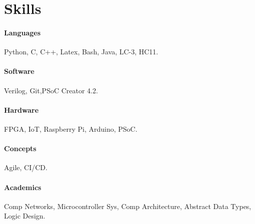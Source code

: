 \documentclass[12pt,letterpaper]{report}
\newcommand{\verticalgap}{2em}
\newcommand{\verticalskillgap}{.2em}
\newcommand{\skillspace}{0.35em}
\newcommand{\rightcolumn}{0.21\linewidth}
\begin{document}
% 
	\begin{minipage}[t]{\rightcolumn}
		\vspace{\verticalgap}
	\section*{Skills}
	\vspace{\verticalskillgap}
    \raggedright
    \paragraph*{Languages}
		Python, C, C++, Latex, Bash, Java, LC-3, HC11. 
	\vspace{\skillspace}
	\paragraph*{Software}
		Verilog, Git,\newline PSoC Creator 4.2.
	\vspace{\skillspace}
    \paragraph*{Hardware}
		 FPGA, IoT, Raspberry Pi, Arduino, PSoC.
	\vspace{\skillspace}
	\paragraph*{Concepts}
	Agile, CI/CD.
	\vspace{\skillspace}
	\paragraph*{Academics}
	Comp Networks,
	Microcontroller Sys,
	Comp Architecture,
	Abstract Data Types,
	Logic Design.
    
	\end{minipage}
%	
\end{document}
